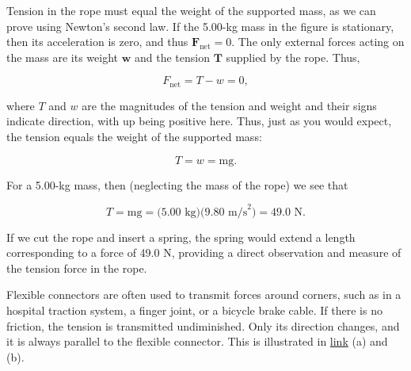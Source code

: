 \documentclass[
]{book}
\begin{document}
Tension in the rope must equal the weight of the supported mass, as we
can prove using Newton's second law. If the 5.00-kg mass in the figure
is stationary, then its acceleration is zero, and thus
\({\textbf{F}_{\text{net}} = 0}{}\). The only external forces acting on
the mass are its weight \(\textbf{w}{}\)\textbf{}
and the tension \(\textbf{T}{}\) supplied by the rope. Thus,

\leavevmode{}%
\[{{F_{\text{net}} = {T - w}} = 0},\]

where \(T{}\)\emph{} and
\(w{}\)\emph{} are the magnitudes of the tension
and weight and their signs indicate direction, with up being positive
here. Thus, just as you would expect, the tension equals the weight of
the supported mass:

\leavevmode{}%
\[{{T = w} = \text{mg}}.\]

For a 5.00-kg mass, then (neglecting the mass of the rope) we see that

\leavevmode{}%
\[{{{T = \text{mg}} = (}\text{5.00\ kg})(9\text{.}\text{80\ m/s}^{2}{) =}\text{49.0\ N}}.\]

If we cut the rope and insert a spring, the spring would extend a length
corresponding to a force of 49.0 N, providing a direct observation and
measure of the tension force in the rope.

Flexible connectors are often used to transmit forces around corners,
such as in a hospital traction system, a finger joint, or a bicycle
brake cable. If there is no friction, the tension is transmitted
undiminished. Only its direction changes, and it is always parallel to
the flexible connector. This is illustrated in
\protect\hyperlink{import-auto-id1318288}{link} (a) and (b).
\end{document}
